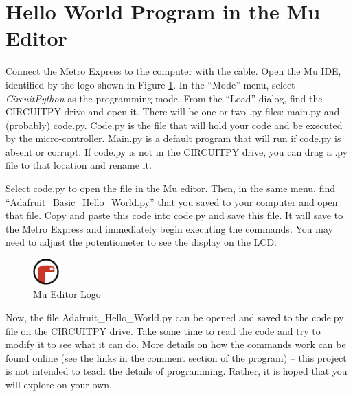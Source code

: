 \documentclass[]{article}
\begin{document}
\section{Hello World Program in the Mu Editor}

 Connect the Metro Express to the computer with the cable. Open the Mu IDE, identified by the logo shown in Figure \ref{mu}. In the ``Mode'' menu, select \textit{CircuitPython} as the programming mode.  From the ``Load'' dialog, find the CIRCUITPY drive and open it.  There will be one or two .py files: main.py and (probably) code.py.  Code.py is the file that will hold your code and be executed by the micro-controller.  Main.py is a default program that will run if code.py is absent or corrupt.  If code.py is not in the CIRCUITPY drive, you  can drag a .py file to that location and rename it.

 Select code.py to open the file in the Mu editor.  Then, in the same menu, find ``Adafruit\_Basic\_Hello\_World.py'' that you saved to your computer and open that file.  Copy and paste this code into code.py and save this file.  It will save to the Metro Express and immediately begin executing the commands. You may need to adjust the potentiometer to see the display on the LCD.


\begin{figure}[h]
	\centering
	\includegraphics[width=1cm]{pics/mu.png}
	\caption{Mu Editor Logo}
	\label{mu}
\end{figure}
  

Now, the file Adafruit\_Hello\_World.py can be opened and saved to the code.py file on the CIRCUITPY drive.  Take some time to read the code and try to modify it to see what it can do.  More details on how the commands work can be found online (see the links in the comment section of the program) -- this project is not intended to teach the details of programming.  Rather, it is hoped that you will explore on your own.
\end{document}
